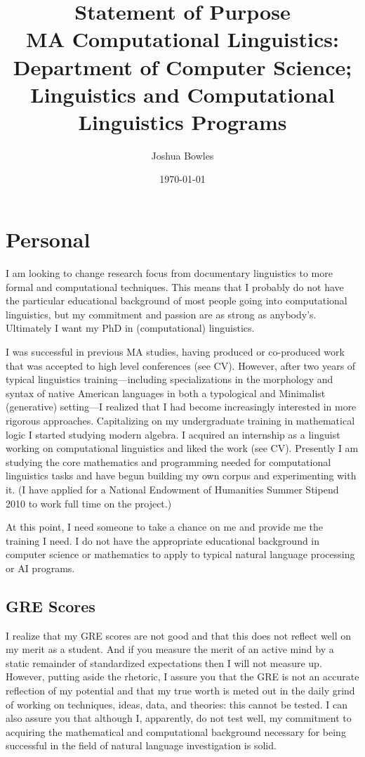 \documentclass[11pt]{article}
\begin{document}
\author{\Large Joshua Bowles}
\title{Statement of Purpose\\ 
MA Computational Linguistics:\\ 
\small Department of Computer Science; Linguistics and Computational Linguistics Programs}
\date{\today}



\maketitle
\section{Personal}
I am looking to change research focus from documentary linguistics to more formal and computational techniques. This means that I probably do not have the particular educational background of most people going into computational linguistics, but my commitment and passion are as strong as anybody's. Ultimately I want my PhD in (computational) linguistics.

I was successful in previous MA studies, having produced or co-produced work that was accepted to high level conferences (see CV). However, after two years of typical linguistics training---including specializations in the morphology and syntax of native American languages in both a typological and Minimalist (generative) setting---I realized that I had become increasingly interested in more rigorous approaches. Capitalizing on my undergraduate training in mathematical logic I started studying modern algebra. I acquired an internship as a linguist working on computational linguistics and liked the work (see CV). Presently I am studying the core mathematics and programming needed for computational linguistics tasks and have begun building my own corpus and experimenting with it. (I have applied for a National Endowment of Humanities Summer Stipend 2010 to work full time on the project.) 

At this point, I need someone to take a chance on me and provide me the training I need. I do not have the appropriate educational background in computer science or mathematics to apply to typical natural language processing or AI programs. 

\subsection{GRE Scores}
I realize that my GRE scores are not good and that this does not reflect well on my merit as a student. And if you measure the merit of an active mind by a static remainder of standardized expectations then I will not measure up. However, putting aside the rhetoric, I assure you that the GRE is not an accurate reflection of my potential and that my true worth is meted out in the daily grind of working on techniques, ideas, data, and theories: this cannot be tested. I can also assure you that although I, apparently, do not test well, my commitment to acquiring the mathematical and computational background necessary for being successful in the field of natural language investigation is solid.    
\end{document}
